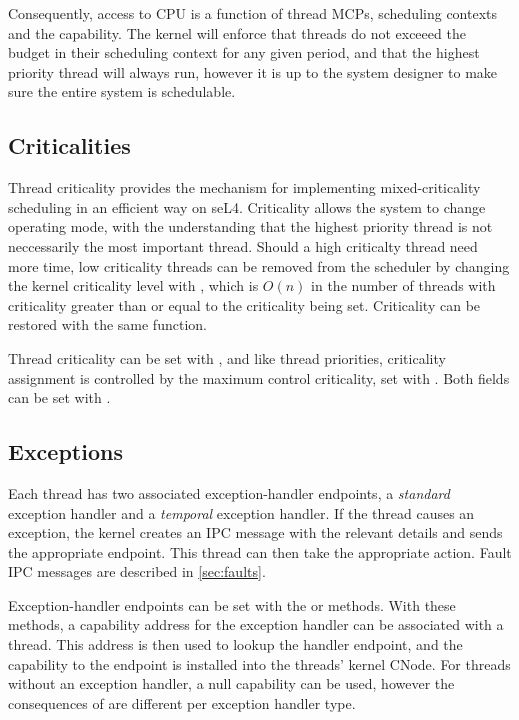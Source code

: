 Consequently, access to CPU is a function of thread MCPs, scheduling contexts and the  capability.
The kernel will enforce that threads do not exceeed the budget in their scheduling context for any given period, and that the highest priority thread will always run, however it is up to the system designer to make sure the entire system is schedulable.

\subsection{Criticalities}
\label{sec:criticality}

Thread criticality provides the mechanism for implementing mixed-criticality scheduling in an efficient way on seL4.
Criticality allows the system to change operating mode, with the understanding that the highest priority thread is not neccessarily the most important thread. 
Should a high criticalty thread need more time, low criticality threads can be removed from the scheduler by changing the kernel criticality level with , which is $O(n)$ in the number of threads with criticality greater than or equal to the criticality being set. 
Criticality can be restored with the same function. 

Thread criticality can be set with , and like thread priorities, criticality assignment is controlled by the maximum control criticality, set with . 
Both fields can be set with .

\subsection{Exceptions}
\label{sec:exceptions}

Each thread has two associated exception-handler endpoints, a \emph{standard} exception handler and a \emph{temporal} exception handler.
If the thread
causes an exception, the kernel creates an IPC message with the relevant
details and sends the appropriate endpoint. This
thread can then take the appropriate action. Fault IPC messages are
described in \autoref{sec:faults}.

Exception-handler
endpoints can be set with the  or
 methods.
With these methods, a capability address for the exception handler can be associated with a thread.
This address is then used to lookup the handler endpoint, and the capability to the endpoint is installed into the threads' kernel CNode.
For threads without an exception handler, a null capability can be used, however the consequences of are different per exception handler type.

